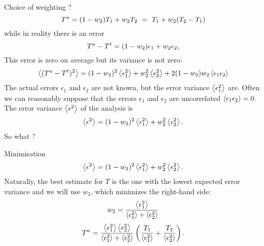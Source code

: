 
\begin{frame}{Choice of weighting ?}
\begin{equation}
{T}^a = (1-w_2) T_1 + w_2 T_2  ~=~ T_1 + w_2 (T_2-T_1)
\end{equation}
while in reality there is an error
\begin{equation}
{T}^a - {T}^t = (1-w_2) \epsilon_1 + w_2 \epsilon_2,
\end{equation}
This error is zero on average but its variance is not zero:
\begin{equation}
\left\langle ({T}^a-{T}^t)^2 \right\rangle = (1-w_2)^2 \left\langle \epsilon_1^2 \right\rangle + w_2^2 \left\langle \epsilon_2^2 \right\rangle + 2 (1-w_2) w_2 
\left\langle \epsilon_1 \epsilon_2 \right\rangle
\end{equation}
The actual errors $\epsilon_1$ and $\epsilon_2$ are not known, but the error variance $\left\langle \epsilon_1^2 \right\rangle$ are.
Often we can reasonably suppose that the errors
$\epsilon_1$ and $\epsilon_2$ are uncorrelated $\left\langle \epsilon_1 \epsilon_2 \right\rangle=0$. 
The error variance $\left\langle \epsilon^2 \right\rangle$ of the analysis is
\begin{equation}
\left\langle \epsilon^2 \right\rangle=(1-w_2)^2 \left\langle \epsilon_1^2 \right\rangle + w_2^2 \left\langle \epsilon_2^2 \right\rangle.
\label{eq:epsilonerror}
\end{equation}
So what ?
\end{frame}


\begin{frame}{Minimisation}
\begin{equation}
\left\langle \epsilon^2 \right\rangle=(1-w_2)^2 \left\langle \epsilon_1^2 \right\rangle + w_2^2 \left\langle \epsilon_2^2 \right\rangle.
\label{eq:epsilonerror}
\end{equation}
Naturally, the best estimate for $T$ is the one with the lowest expected error variance and we will use $w_2$, which minimizes
the right-hand side:
\begin{equation}
w_2 = \frac{\left\langle \epsilon_1^2 \right\rangle}{\left\langle \epsilon_1^2 \right\rangle+\left\langle \epsilon_2^2 \right\rangle}
\label{eq:weighterror}
\end{equation}
\begin{equation}
{T}^a=   {\left\langle \epsilon_1^2 \right\rangle \left\langle \epsilon_2^2 \right\rangle \over \left\langle \epsilon_1^2 \right\rangle 
+ \left\langle \epsilon_2^2 \right\rangle }\left( {T_1 \over \left\langle \epsilon_1^2 \right\rangle} + {T_2 \over \left\langle \epsilon_2^2 \right\rangle}\right) .
 \label{eq:analyzedTb}
\end{equation}
\end{frame}

